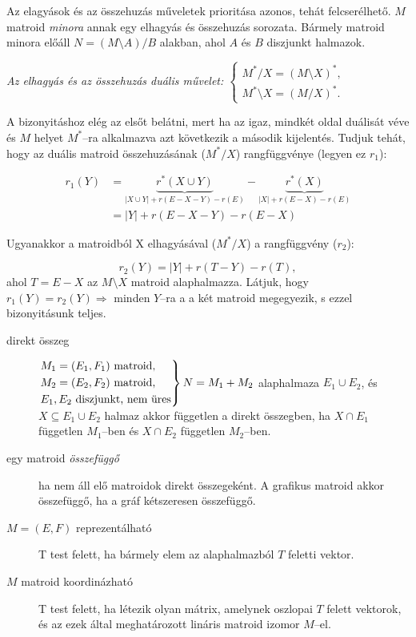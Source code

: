 Az elagyások és az összehuzás műveletek prioritása azonos, tehát felcserélhető. $M$ matroid 
\emph{minora} annak egy elhagyás és összehuzás sorozata. Bármely matroid minora előáll
$N=(M \setminus A) / B$ alakban, ahol $A$ és $B$ diszjunkt halmazok.

\emph{Az elhagyás és az összehuzás duális művelet: $\begin{cases}
M^*/X=(M \setminus X)^*, \\
M^* \setminus X = (M / X)^*.
\end{cases}$}

A bizonyitáshoz elég az elsőt belátni, mert ha az igaz, mindkét oldal duálisát
véve és $M$ helyet $M^*$--ra alkalmazva azt következik a második kijelentés.
Tudjuk tehát, hogy az duális matroid összehuzásának ($M^*/X$) rangfüggvénye
(legyen ez $r_1$):

\begin{align*}
r_1(Y) &=\underbrace{r^*(X \cup Y)}_{|X \cup Y| + r(E-X-Y) - r(E)} - 
		 \underbrace{r^*(X)}_{|X| + r(E-X) - r(E)} \\
	   &= |Y| + r(E-X-Y) - r(E-X) 
\end{align*}

Ugyanakkor a matroidból X elhagyásával ($M^*/X$) a rangfüggvény ($r_2$):

\[ r_2(Y) = |Y| + r(T-Y) - r(T),\] ahol $T = E-X$ az $M\setminus X$ matroid
alaphalmazza. Látjuk, hogy $r_1(Y)=r_2(Y)\Rightarrow$ minden $Y$--ra a a két
matroid megegyezik, s ezzel bizonyitásunk teljes.

\begin{description}
  \item[direkt összeg] $\begin{rcases}
  M_1=(E_1,F_1) \mbox{ matroid}, \\
  M_2=(E_2,F_2) \mbox{ matroid}, \\
  E_1, E_2 \mbox{ diszjunkt, nem üres} \end{rcases} N = M_1+ M_2$ alaphalmaza
  $E_1 \cup E_2$, és $X \subseteq E_1 \cup E_2$ halmaz akkor független a direkt
  összegben, ha $X \cap E_1$ független $M_1$--ben és $X \cap E_2$ független
  $M_2$--ben. 
  \item[egy matroid \emph{összefüggő}] ha nem áll elő matroidok direkt
  összegeként. A grafikus matroid akkor összefüggő, ha a gráf kétszeresen
  összefüggő.
  \item[$M=(E,F)$ reprezentálható] T test felett, ha bármely elem az alaphalmazból
  $T$ feletti vektor. 
  \item[$M$ matroid koordinázható]T test felett, ha létezik olyan mátrix, amelynek oszlopai
  $T$ felett vektorok, és az ezek által meghatározott lináris matroid izomor $M$--el. 
\end{description}

